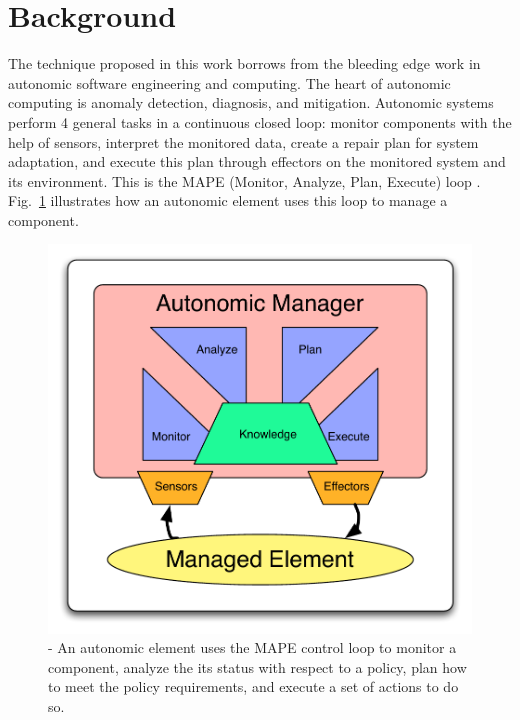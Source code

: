 \section{Background}
\label{sec:background}
The technique proposed in this work borrows from the bleeding edge work in
autonomic software engineering and computing.  The heart of autonomic computing
is anomaly detection, diagnosis, and mitigation. Autonomic systems perform 4
general tasks in a continuous closed loop: monitor components with the help of
sensors, interpret the monitored data, create a repair plan for system
adaptation, and execute this plan through effectors on the monitored system and
its environment. This is the MAPE (Monitor, Analyze, Plan, Execute) loop
\cite{1160055}. Fig.~\ref{fig:mape} illustrates how an autonomic element uses
this loop to manage a component.

\begin{figure}[tb]
  \centering
  \includegraphics[width=\columnwidth]{images/mape}
  \caption{- An autonomic element uses the MAPE control loop to monitor a
		component, analyze the its status with respect to a policy, plan how to
		meet the policy requirements, and execute a set of actions to do so.}
	\label{fig:mape}
\end{figure}

